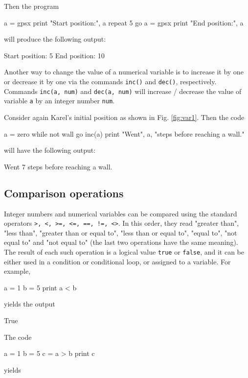 \noindent
Then the program

\begin{bluecode}
a = gpsx
print "Start position:", a
repeat 5
    go
a = gpsx 
print "End position:", a
\end{bluecode}
will produce the following output:

\begin{greencode}
Start position: 5
End position: 10
\end{greencode}
Another way to change the value of a numerical variable is to increase it by one or 
decrease it by one via the commands {\tt inc()} and 
{\tt dec()}, respectively. Commands {\tt inc(a, num)} and 
{\tt dec(a, num)} will increase / decrease the value of variable {\tt a}
by an integer number {\tt num}.

Consider again Karel's initial position as shown 
in Fig. \ref{fig:var1}. Then the code

\begin{bluecode}
a = zero
while not wall
    go
    inc(a)
print "Went", a, "steps before reaching a wall."
\end{bluecode}
will have the following output:

\begin{greencode}
Went 7 steps before reaching a wall.
\end{greencode}

\subsection{Comparison operations}

Integer numbers and numerical variables can be compared using the 
standard operators {\tt >, <, >=, <=, ==, !=, <>}. In this order, 
they read "greater than", "less than", "greater than or equal to", 
"less than or equal to", "equal to", "not equal to" and "not equal to"
(the last two operations have the same meaning). The result of each such 
operation is a logical value {\tt true} or {\tt false}, and it can be 
either used in a condition or conditional loop, or assigned to 
a variable. For example,

\begin{bluecode}
a = 1
b = 5
print a < b
\end{bluecode}
yields the output

\begin{greencode}
True
\end{greencode}
The code

\begin{bluecode}
a = 1
b = 5
c = a > b
print c
\end{bluecode}
yields

